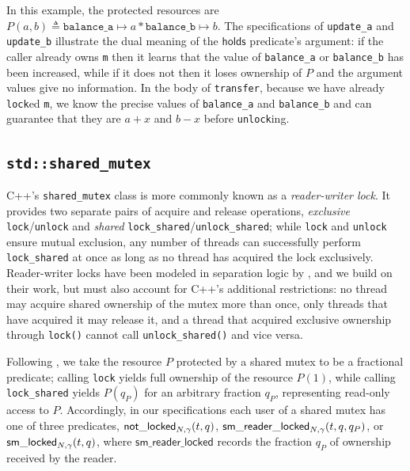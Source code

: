 In this example, the protected resources are $P(a, b) \triangleq \texttt{balance\_a} \mapsto a \ast \texttt{balance\_b} \mapsto b$. The specifications of \lstinline{update_a} and \lstinline{update_b} illustrate the dual meaning of the $\mathsf{holds}$ predicate's argument: if the caller already owns \texttt{m} then it learns that the value of \lstinline{balance_a} or \lstinline{balance_b} has been increased, while if it does not then it loses ownership of $P$ and the argument values give no information. In the body of \lstinline{transfer}, because we have already \lstinline{lock}ed \lstinline{m}, we know the precise values of \lstinline{balance_a} and \lstinline{balance_b} and can guarantee that they are $a + x$ and $b - x$ before \lstinline{unlock}ing.

\subsection{\texorpdfstring{\lstinline{std::shared_mutex}}{std::shared\_mutex}}
\label{shared-mutex}

C++'s \lstinline{shared_mutex} class is more commonly known as a \emph{reader-writer lock}. It provides two separate pairs of acquire and release operations, \emph{exclusive} \lstinline{lock}/\lstinline{unlock} and \emph{shared} {\lstset{breakatwhitespace}\lstinline{lock_shared}/\lstinline{unlock_shared};} while \lstinline{lock} and \lstinline{unlock} ensure mutual exclusion, any number of threads can successfully perform \lstinline{lock_shared} at once as long as no thread has acquired the lock exclusively. Reader-writer locks have been modeled in separation logic by \citet{heaplang-rw-lock}, and we build on their work, but must also account for C++'s additional restrictions: no thread may acquire shared ownership of the mutex more than once, only threads that have acquired it may release it, and a thread that acquired exclusive ownership through \lstinline|lock()| cannot call \lstinline|unlock_shared()| and vice versa.

Following \citet{heaplang-rw-lock}, we take the resource $P$ protected by a shared mutex to be a fractional predicate;
calling \lstinline{lock} yields full ownership of the resource $P(1)$,
while calling \lstinline{lock_shared} yields $P(q_P)$ for an arbitrary fraction $q_P$,
representing read-only access to $P$.
Accordingly, in our specifications each user of a shared mutex has one of three predicates, $\mathsf{not\_locked}_{N, \gamma}(t, q)$, $\mathsf{sm\_reader\_locked}_{N, \gamma}(t, q, q_P)$, or $\mathsf{sm\_locked}_{N, \gamma}(t, q)$, where $\mathsf{sm\_reader\_locked}$ records the fraction $q_P$ of ownership received by the reader.

